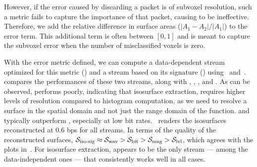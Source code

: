 However, if the error caused by discarding a packet is of subvoxel resolution, such a metric fails
to capture the importance of that packet, causing \siop to be ineffective. Therefore, we add the
relative difference in surface areas ($|A_1-A_2|/|A_1|$) to the error term. This additional term is
often between $[0, 1]$ and is meant to capture the subvoxel error when the number of misclassified
voxels is zero.

With the error metric defined, we can compute a data-dependent stream optimized for this metric
(\siop) and a stream based on its signature (\sisg) using~
and~.  compares the performances of these two
streams, along with \sbit, \slvl, \swav, and \smag. As can be observed, \slvl performs poorly,
indicating that isosurface extraction, requires higher levels of resolution compared to histogram
computation, as we need to resolve a surface in the spatial domain and not just the range domain of
the function. \swav and \sisg typically outperform \sbit, especially at low bit
rates.~ renders the isosurfaces reconstructed at 0.6 bps for
all streams. In terms of the quality of the reconstructed surfaces, $\sisg \approx \swav > \sbit >
\smag > \slvl$, which agrees with the plots in~. For isosurface
extraction, \swav appears to be the only stream --- among the data-independent ones --- that
consistently works well in all cases.
